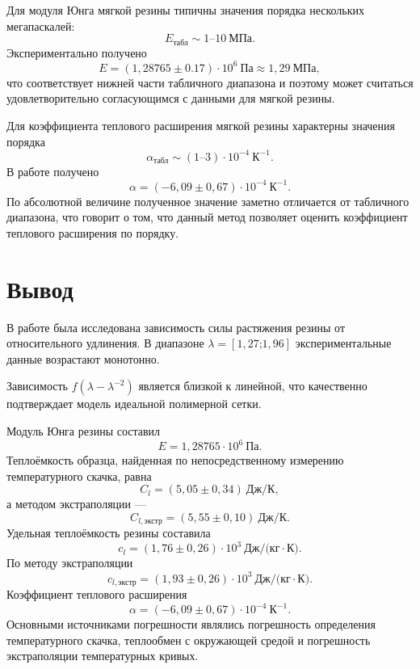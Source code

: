 \documentclass[12pt,a4paper]{article}
\numberwithin{equation}{section}
\begin{document}
Для модуля Юнга мягкой резины типичны значения порядка нескольких мегапаскалей:
\[
    E_{\text{табл}} \sim 1\text{--}10\ \text{МПа}.
\]
Экспериментально получено
\[
    E=(1{,}28765 \pm 0.17)\cdot10^6\ \text{Па}\approx 1{,}29\ \text{МПа},
\]
что соответствует нижней части табличного диапазона и поэтому может считаться удовлетворительно согласующимся
с данными для мягкой резины.

Для коэффициента теплового расширения мягкой резины характерны значения порядка
\[
    \alpha_{\text{табл}} \sim (1\text{--}3)\cdot10^{-4}\ \text{К}^{-1}.
\]
В работе получено
\[
    \alpha=(-6{,}09\pm0{,}67)\cdot10^{-4}\ \text{К}^{-1}.
\]
По абсолютной величине полученное значение заметно отличается от табличного диапазона, что говорит о том,
что данный метод позволяет оценить коэффициент теплового расширения по порядку.

\section*{Вывод}

В работе была исследована зависимость силы растяжения резины от относительного удлинения.
В диапазоне $\lambda=[1{,}27\text{;}1{,}96]$ экспериментальные данные возрастают монотонно.
\par
Зависимость
$f\left(\lambda-\lambda^{-2}\right)$
является близкой к линейной, что 
качественно подтверждает модель идеальной полимерной сетки.

Модуль Юнга резины составил
\[
    E=1{,}28765\cdot10^6\ \text{Па}.
\]
Теплоёмкость образца, найденная по непосредственному измерению температурного скачка, равна
\[
    C_l=(5{,}05\pm0{,}34)\ \text{Дж/К},
\]
а методом экстраполяции ---
\[
    C_{l,\text{экстр}}
    =
    (5{,}55\pm0{,}10)\ \text{Дж/К}.
\]
Удельная теплоёмкость резины составила
\[
    c_l=(1{,}76\pm0{,}26)\cdot10^3
    \ \text{Дж/(кг}\cdot\text{К)}.
\]
По методу экстраполяции
\[
    c_{l,\text{экстр}}=(1{,}93\pm0{,}26)\cdot10^3
    \ \text{Дж/(кг}\cdot\text{К)}.
\]
Коэффициент теплового расширения
\[
    \alpha=(-6{,}09\pm0{,}67)\cdot10^{-4}\ \text{К}^{-1}.
\]
Основными источниками погрешности являлись погрешность определения температурного
скачка, теплообмен с окружающей средой и погрешность экстраполяции температурных
кривых.
\end{document}
